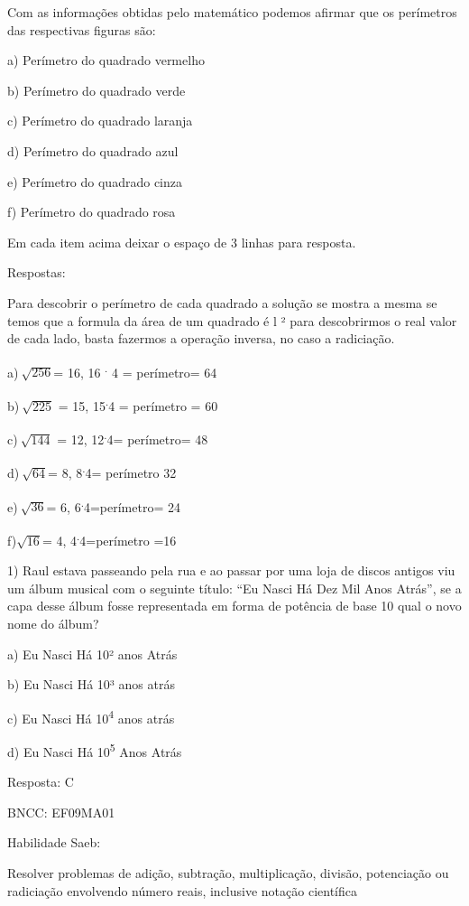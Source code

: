 {Com as informações obtidas pelo matemático podemos afirmar que os
perímetros das respectivas figuras são:

a) Perímetro do quadrado vermelho

b) Perímetro do quadrado verde

c) Perímetro do quadrado laranja

d) Perímetro do quadrado azul

e) Perímetro do quadrado cinza

f) Perímetro do quadrado rosa

Em cada item acima deixar o espaço de 3 linhas para resposta.

Respostas:

Para descobrir o perímetro de cada quadrado a solução se mostra a mesma
se temos que a formula da área de um quadrado é l ² para descobrirmos o
real valor de cada lado, basta fazermos a operação inversa, no caso a
radiciação.

a)\(\ \sqrt{256}\)= 16, 16 \textsuperscript{.} 4 = perímetro= 64

b)\(\ \sqrt{225}\) = 15, 15\textsuperscript{.}4 = perímetro = 60

c)\(\ \sqrt{144}\) = 12, 12\textsuperscript{.}4= perímetro= 48

d)\(\ \sqrt{64}\)= 8, 8\textsuperscript{.}4= perímetro 32

e)\(\ \sqrt{36}\)= 6, 6\textsuperscript{.}4=perímetro= 24

f)\(\sqrt{16}\)= 4, 4\textsuperscript{.}4=perímetro =16


1) Raul estava passeando pela rua e ao passar por uma loja de discos
antigos viu um álbum musical com o seguinte título: ``Eu Nasci Há Dez
Mil Anos Atrás'', se a capa desse álbum fosse representada em forma de
potência de base 10 qual o novo nome do álbum?

a) Eu Nasci Há 10² anos Atrás

b) Eu Nasci Há 10³ anos atrás

c) Eu Nasci Há 10\textsuperscript{4} anos atrás

d) Eu Nasci Há 10\textsuperscript{5} Anos Atrás

Resposta: C

BNCC: EF09MA01

Habilidade Saeb:

Resolver problemas de adição, subtração, multiplicação, divisão,
potenciação ou radiciação envolvendo número reais, inclusive notação
científica

}

